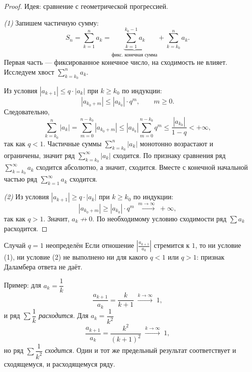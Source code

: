 \begin{proof}
	Идея: сравнение с геометрической прогрессией.
	
	\emph{(1)} Запишем частичную сумму:
	\[
	S_n = \sum_{k=1}^{n} a_k
	= \underbrace{\sum_{k=1}^{k_0-1} a_k}_{\text{фикс. конечная сумма}}
	+ \sum_{k=k_0}^{n} a_k.
	\]
	Первая часть --- фиксированное конечное число, на сходимость не влияет.
	Исследуем хвост $\sum_{k=k_0}^{n} a_k$.
	
	Из условия $|a_{k+1}| \le q \cdot |a_k|$ при $k \ge k_0$ по индукции:
	\[
	|a_{k_0 + m}| \le |a_{k_0}| \cdot q^m, \qquad m \ge 0.
	\]
	Следовательно,
	\[
	\sum_{k=k_0}^{n} |a_k|
	= \sum_{m=0}^{n-k_0} |a_{k_0+m}|
	\le |a_{k_0}| \sum_{m=0}^{n-k_0} q^m
	\le \frac{|a_{k_0}|}{1-q} < +\infty,
	\]
	так как $q < 1$. Частичные суммы $\sum_{k=k_0}^{n} |a_k|$ монотонно возрастают
	и ограничены, значит ряд $\sum_{k=k_0}^{\infty} |a_k|$ сходится. По признаку
	сравнения ряд $\sum_{k=k_0}^{\infty} a_k$ сходится абсолютно, а значит,
	сходится. Вместе с конечной начальной частью ряд $\sum_{k=1}^{\infty} a_k$ сходится.
	
	\emph{(2)} Из условия $|a_{k+1}| \ge q \cdot |a_k|$ при $k \ge k_0$
	по индукции:
	\[
	|a_{k_0 + m}| \ge |a_{k_0}| \cdot q^m \;\xrightarrow{m \to \infty}\; +\infty,
	\]
	так как $q > 1$. Значит, $a_k \not\to 0$. По необходимому условию сходимости
	ряд $\sum a_k$ расходится.
\end{proof}

\begin{Remark}{Случай $q = 1$ неопределён}{}
	Если отношение $\left|\frac{a_{k+1}}{a_k}\right|$ стремится к $1$, то ни
	условие (1), ни условие (2) не выполнено ни для какого $q < 1$ или $q > 1$:
	признак Даламбера ответа не даёт.
	
	Пример: для $a_k = \dfrac{1}{k}$
	\[
	\frac{a_{k+1}}{a_k} = \frac{k}{k+1} \;\xrightarrow{k\to\infty}\; 1,
	\]
	и ряд $\sum \dfrac{1}{k}$ \emph{расходится}. Для $a_k = \dfrac{1}{k^2}$
	\[
	\frac{a_{k+1}}{a_k} = \frac{k^2}{(k+1)^2} \;\xrightarrow{k\to\infty}\; 1,
	\]
	но ряд $\sum \dfrac{1}{k^2}$ \emph{сходится}. Один и тот же предельный
	результат соответствует и сходящемуся, и расходящемуся ряду.
\end{Remark}